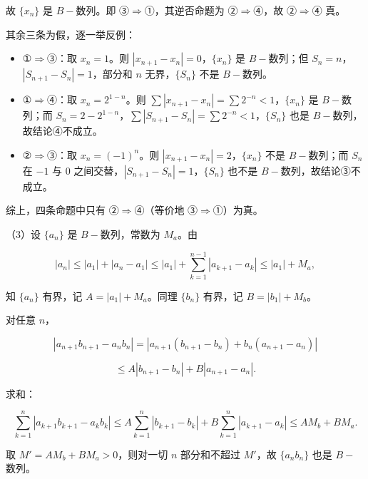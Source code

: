 \begin{answer}
故 $\{x_n\}$ 是 $B-$数列。即 ③$\Rightarrow$①，其逆否命题为 ②$\Rightarrow$④，故 ②$\Rightarrow$④ 真。

其余三条为假，逐一举反例：

\begin{itemize}
\item ①$\Rightarrow$③：取 $x_n=1$。则 $|x_{n+1}-x_n|=0$，$\{x_n\}$ 是 $B-$数列；但 $S_n=n$，$|S_{n+1}-S_n|=1$，部分和 $n$ 无界，$\{S_n\}$ 不是 $B-$数列。
\item ①$\Rightarrow$④：取 $x_n=2^{1-n}$。则 $\sum|x_{n+1}-x_n|=\sum2^{-n}<1$，$\{x_n\}$ 是 $B-$数列；而 $S_n=2-2^{1-n}$，$\sum|S_{n+1}-S_n|=\sum2^{-n}<1$，$\{S_n\}$ 也是 $B-$数列，故结论④不成立。
\item ②$\Rightarrow$③：取 $x_n=(-1)^n$。则 $|x_{n+1}-x_n|=2$，$\{x_n\}$ 不是 $B-$数列；而 $S_n$ 在 $-1$ 与 $0$ 之间交替，$|S_{n+1}-S_n|=1$，$\{S_n\}$ 也不是 $B-$数列，故结论③不成立。
\end{itemize}

综上，四条命题中只有 ②$\Rightarrow$④（等价地 ③$\Rightarrow$①）为真。

（3）设 $\{a_n\}$ 是 $B-$数列，常数为 $M_a$。由

\nopagebreak[4]
\[|a_n|\leqslant|a_1|+|a_n-a_1|
\leqslant|a_1|+\sum_{k=1}^{n-1}|a_{k+1}-a_k|
\leqslant|a_1|+M_a,\]

知 $\{a_n\}$ 有界，记 $A=|a_1|+M_a$。同理 $\{b_n\}$ 有界，记 $B=|b_1|+M_b$。

对任意 $n$，

\nopagebreak[4]
\[|a_{n+1}b_{n+1}-a_nb_n|
=|a_{n+1}(b_{n+1}-b_n)+b_n(a_{n+1}-a_n)|\]

\nopagebreak[4]
\[\leqslant A|b_{n+1}-b_n|+B|a_{n+1}-a_n|.\]

求和：

\nopagebreak[4]
\[\sum_{k=1}^n|a_{k+1}b_{k+1}-a_kb_k|
\leqslant A\sum_{k=1}^n|b_{k+1}-b_k|+B\sum_{k=1}^n|a_{k+1}-a_k|
\leqslant AM_b+BM_a.\]

取 $M'=AM_b+BM_a>0$，则对一切 $n$ 部分和不超过 $M'$，故 $\{a_nb_n\}$ 也是 $B-$数列。


\end{answer}